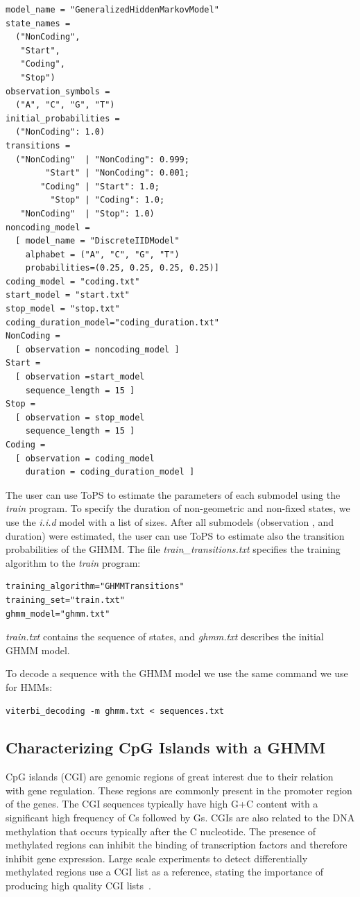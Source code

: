 \documentclass[10pt]{article}
\begin{document}
\begin{Verbatim}[frame=single,  label={ghmm.txt}]
model_name = "GeneralizedHiddenMarkovModel"
state_names =
  ("NonCoding",
   "Start",
   "Coding",
   "Stop")
observation_symbols =
  ("A", "C", "G", "T")
initial_probabilities =
  ("NonCoding": 1.0)
transitions =
  ("NonCoding"  | "NonCoding": 0.999;
        "Start" | "NonCoding": 0.001;
       "Coding" | "Start": 1.0;
         "Stop" | "Coding": 1.0;
   "NonCoding"  | "Stop": 1.0)
noncoding_model =
  [ model_name = "DiscreteIIDModel"
    alphabet = ("A", "C", "G", "T")
    probabilities=(0.25, 0.25, 0.25, 0.25)]
coding_model = "coding.txt"
start_model = "start.txt"
stop_model = "stop.txt"
coding_duration_model="coding_duration.txt"
NonCoding =
  [ observation = noncoding_model ]
Start =
  [ observation =start_model
    sequence_length = 15 ]
Stop =
  [ observation = stop_model
    sequence_length = 15 ]
Coding =
  [ observation = coding_model
    duration = coding_duration_model ]
\end{Verbatim}


The user can use  ToPS to estimate the parameters of each submodel using the \textit{train} program. To specify the duration of non-geometric and non-fixed states, we  use the \textit{i.i.d} model with a list of sizes. After all submodels (observation , and duration) were estimated, the user can use ToPS to estimate also the transition probabilities of the GHMM. The file \textit{train\_transitions.txt}  specifies the training algorithm to the \textit{train} program:
\begin{Verbatim}[frame=single, label=train\_transitions.txt]
training_algorithm="GHMMTransitions"
training_set="train.txt"
ghmm_model="ghmm.txt"
\end{Verbatim}

\textit{train.txt}  contains the sequence of states, and \textit{ghmm.txt} describes the initial GHMM model.

To decode a sequence with the GHMM model we use the same command we use for HMMs:


\begin{Verbatim}[frame=single, label={Command line}]
viterbi_decoding -m ghmm.txt < sequences.txt
\end{Verbatim}


\subsection*{Characterizing CpG Islands with a GHMM}

CpG islands (CGI) are genomic regions of great interest due to their relation with gene regulation. These regions are commonly present in the promoter region of the genes. The CGI sequences typically have high G+C content with a significant high frequency of Cs followed by Gs. CGIs are also related to the DNA methylation that occurs typically after the C nucleotide. The presence of methylated regions can inhibit the binding of transcription factors and therefore inhibit gene expression. Large scale experiments to detect differentially methylated regions use a CGI list as a reference, stating the importance  of producing high quality CGI lists~\cite{Wu2010}.
\end{document}
